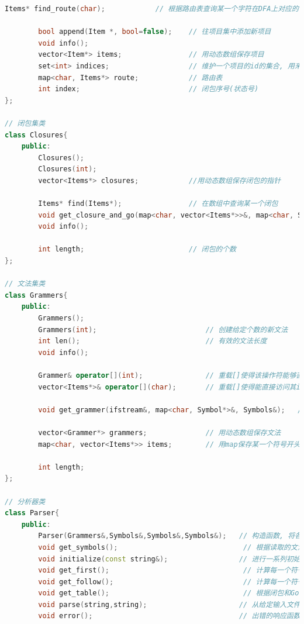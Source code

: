 \documentclass{zpt}
\begin{document}
\begin{lstlisting}[language=c++]
        Items* find_route(char);            // 根据路由表查询某一个字符在DFA上对应的下一个闭包

        bool append(Item *, bool=false);    // 往项目集中添加新项目
        void info();
        vector<Item*> items;                // 用动态数组保存项目
        set<int> indices;                   // 维护一个项目的id的集合, 用来判断某两个项目集是否相等
        map<char, Items*> route;            // 路由表
        int index;                          // 闭包序号(状态号)
};

// 闭包集类
class Closures{
    public:
        Closures();
        Closures(int);
        vector<Items*> closures;            //用动态数组保存闭包的指针

        Items* find(Items*);                // 在数组中查询某一个闭包
        void get_closure_and_go(map<char, vector<Items*>>&, map<char, Symbol*>&);               // 计算所有闭包和对应的go函数
        void info();

        int length;                         // 闭包的个数
};

// 文法集类
class Grammers{
    public:
        Grammers();
        Grammers(int);                          // 创建给定个数的新文法
        int len();                              // 有效的文法长度
        void info();

        Grammer& operator[](int);               // 重载[]使得该操作符能够直接访问其grammer成员
        vector<Items*>& operator[](char);       // 重载[]使得能直接访问其items成员

        void get_grammer(ifstream&, map<char, Symbol*>&, Symbols&);   // 读入并加载文法, 为所有独特的符号创建一个实例

        vector<Grammer*> grammers;              // 用动态数组保存文法
        map<char, vector<Items*>> items;        // 用map保存某一个符号开头的项目集的数组

        int length;
};

// 分析器类
class Parser{
    public:
        Parser(Grammers&,Symbols&,Symbols&,Symbols&);   // 构造函数, 将各个成员赋值
        void get_symbols();                              // 根据读取的文法, 创建两个符号集, 对应终结符和非终结符
        void initialize(const string&);                 // 进行一系列初始化操作, 包括构建符号集, 加载文法, 计算闭包等
        void get_first();                                // 计算每一个符号的first集
        void get_follow();                               // 计算每一个符号的follow集
        void get_table();                                // 根据闭包和Go, 构建分析表
        void parse(string,string);                      // 从给定输入文件读取输入并分词, 然后写入给定输出文件中, 之后进行语法分析
        void error();                                   // 出错的响应函数


\end{lstlisting}
\end{document}
